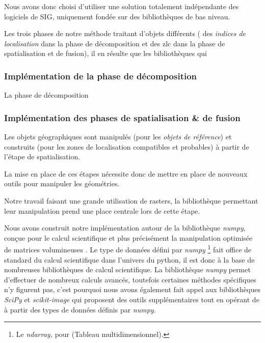 Nous avons donc choisi d'utiliser une solution totalement indépendante
des logiciels de SIG, uniquement fondée sur des bibliothèques de bas
niveau.


Les trois phases de notre méthode traitant d'objets différents (\ie
des \emph{indices de localisation} dans la phase de décomposition et
des \ac{zlc} dans la phase de spatialisation et de fusion), il en
résulte que les bibliothèques qui 

\subsubsection{Implémentation de la phase de décomposition}

La phase de décomposition


\subsubsection{Implémentation des phases de spatialisation \& de fusion}

Les objets géographiques sont manipulés (pour les \emph{objets de
  référence}) et construits (pour les zones de localisation
compatibles et probables) à partir de l'étape de spatialisation.

La mise en place de ces étapes nécessite donc de mettre en place de
nouveaux outils pour manipuler les géométries.

Notre travail faisant une grande utilisation de rasters, la
bibliothèque permettant leur manipulation prend une place centrale
lors de cette étape.

Nous avons construit notre implémentation autour de la bibliothèque
\emph{numpy,} conçue pour le calcul scientifique et plus précisément
la manipulation optimisée de matrices volumineuses
\autocite{vanderWalt2011}. Le type de données défini par \emph{numpy}
\footnote{Le \emph{ndarray,} pour
   (Tableau
  multidimensionnel).} fait office de standard du calcul scientifique
dans l'univers du python, il est donc à la base de nombreuses
bibliothèques de calcul scientifique.  La bibliothèque \emph{numpy}
permet d'effectuer de nombreux calculs avancés, toutefois certaines
méthodes spécifiques n'y figurent pas, c'est pourquoi nous avons
également fait appel aux bibliothèques \emph{SciPy} et
\emph{scikit-image} \autocite{vanderWalt2014,Virtanen2020} qui
proposent des outils supplémentaires tout en opérant de à partir des
types de données définis par \emph{numpy.}




